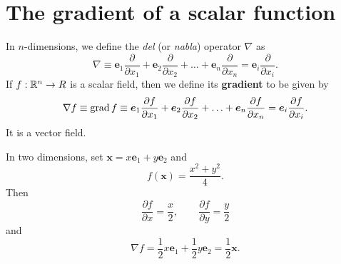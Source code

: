 \chapter{The gradient of a scalar function}

\begin{definition}[Gradient]
    In $n$-dimensions, we define the \emph{del} (or \emph{nabla}) operator $\nabla$ as
    \[ \nabla \equiv \bm e_1 \frac{\partial}{\partial x_1} + \bm e_2 \frac{\partial}{\partial x_2} + \ldots + \bm e_n \frac{\partial}{\partial x_n} = \bm e_i \frac{\partial}{\partial x_i}. \]
    If $f : \mathbb{R}^n \to R$ is a scalar field, then we define its \textbf{gradient} to be given by
    \[ \nabla{f} \equiv \operatorname{grad}{f} \equiv \bm e_1 \frac{\partial f}{\partial x_1} + \bm e_2 \frac{\partial f}{\partial x_2} + \ldots + \bm e_n \frac{\partial f}{\partial x_n} = \bm e_i \frac{\partial f}{\partial x_i}. \] 
    It is a vector field.
\end{definition}

\begin{example}
    In two dimensions, set 
    $\bm x = x \bm e_1 + y \bm e_2$
    and 
    \[ f(\bm x) = \frac{x^2 + y^2}{4}. \]
    Then
    \[ \frac{\partial f}{\partial x} = \frac{x}{2}, \qquad \frac{\partial f}{\partial y} = \frac{y}{2} \]
    and
    \[ \nabla{f} = \frac{1}{2} x \bm e_1 + \frac{1}{2} y \bm e_2 = \frac{1}{2} \bm x.\]
\end{example}
